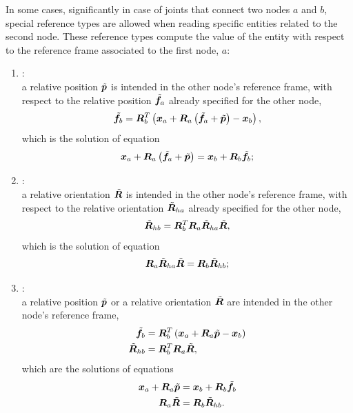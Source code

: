 In some cases, significantly in case of joints that connect two nodes
$a$ and $b$, special reference types are allowed
when reading specific entities related to the second node.
These reference types compute the value of the entity with respect
to the reference frame associated to the first node, $a$:
\begin{enumerate}
\item {}: \\
	a relative position $\tilde{\boldsymbol{p}}$ is intended in the other node's
	reference frame, with respect to the relative position $\tilde{\boldsymbol{f}}_a$
	already specified for the other node,
\begin{equation}
	\tilde{\boldsymbol{f}}_b = \boldsymbol{R}_b^T\left( 
		\boldsymbol{x}_a + \boldsymbol{R}_a \left( 
			\tilde{\boldsymbol{f}}_a
			+ \tilde{\boldsymbol{p}}
		 \right)
		- \boldsymbol{x}_b
	 \right) ,
\end{equation}
	which is the solution of equation
\begin{equation}
	\boldsymbol{x}_a + \boldsymbol{R}_a \left( \tilde{\boldsymbol{f}}_a + \tilde{\boldsymbol{p}} \right)
	= \boldsymbol{x}_b + \boldsymbol{R}_b \tilde{\boldsymbol{f}}_b ;
\end{equation}

\item {}: \\
	a relative orientation $\tilde{\boldsymbol{R}} $ is intended in the other node's
	reference frame, with respect to the relative orientation
	$\tilde{\boldsymbol{R}}_{ha}$ already specified for the other node,
\begin{equation}
	\tilde{\boldsymbol{R}}_{hb} = \boldsymbol{R}_b^T \boldsymbol{R}_a \tilde{\boldsymbol{R}}_{ha} \tilde{\boldsymbol{R}} ,
\end{equation}
	which is the solution of equation
\begin{equation}
	\boldsymbol{R}_a \tilde{\boldsymbol{R}}_{ha} \tilde{\boldsymbol{R}}
	= \boldsymbol{R}_b \tilde{\boldsymbol{R}}_{hb} ;
\end{equation}

\item {}: \\
	a relative position $\tilde{\boldsymbol{p}}$
	or a relative orientation $\tilde{\boldsymbol{R}}$
	are intended in the other node's reference frame,
\begin{subequations}
\begin{align}
	\tilde{\boldsymbol{f}}_b &= \boldsymbol{R}_b^T\left( 
		\boldsymbol{x}_a + \boldsymbol{R}_a \tilde{\boldsymbol{p}}
		- \boldsymbol{x}_b
	 \right) \\
	\tilde{\boldsymbol{R}}_{hb} &= \boldsymbol{R}_b^T \boldsymbol{R}_a \tilde{\boldsymbol{R}} ,
\end{align}
\end{subequations}
	which are the solutions of equations
\begin{subequations}
\begin{align}
	\boldsymbol{x}_a + \boldsymbol{R}_a \tilde{\boldsymbol{p}}
	&= \boldsymbol{x}_b + \boldsymbol{R}_b \tilde{\boldsymbol{f}}_b \\
	\boldsymbol{R}_a \tilde{\boldsymbol{R}}
	&= \boldsymbol{R}_b \tilde{\boldsymbol{R}}_{hb} .
\end{align}
\end{subequations}
\end{enumerate}

